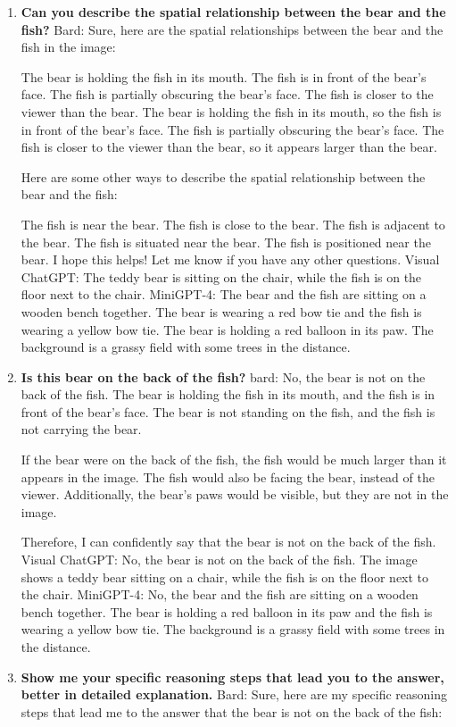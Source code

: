     \begin{enumerate}
        \item \textbf{Can you describe the spatial relationship between the bear and the fish?}
        \subitem Bard:
        Sure, here are the spatial relationships between the bear and the fish in the image:

        The bear is holding the fish in its mouth.
        The fish is in front of the bear's face.
        The fish is partially obscuring the bear's face.
        The fish is closer to the viewer than the bear.
        The bear is holding the fish in its mouth, so the fish is in front of the bear's face. The fish is partially obscuring the bear's face. The fish is closer to the viewer than the bear, so it appears larger than the bear.

        Here are some other ways to describe the spatial relationship between the bear and the fish:

        The fish is near the bear.
        The fish is close to the bear.
        The fish is adjacent to the bear.
        The fish is situated near the bear.
        The fish is positioned near the bear.
        I hope this helps! Let me know if you have any other questions.
        \subitem Visual ChatGPT: The teddy bear is sitting on the chair, while the fish is on the floor next to the chair.
        \subitem MiniGPT-4: The bear and the fish are sitting on a wooden bench together. The bear is wearing a red bow tie and the fish is wearing a yellow bow tie. The bear is holding a red balloon in its paw. The background is a grassy field with some trees in the distance.
        \item \textbf{Is this bear on the back of the fish?}
        \subitem bard:
        No, the bear is not on the back of the fish. The bear is holding the fish in its mouth, and the fish is in front of the bear's face. The bear is not standing on the fish, and the fish is not carrying the bear.
        
        If the bear were on the back of the fish, the fish would be much larger than it appears in the image. The fish would also be facing the bear, instead of the viewer. Additionally, the bear's paws would be visible, but they are not in the image.
        
        Therefore, I can confidently say that the bear is not on the back of the fish.
        \subitem Visual ChatGPT: No, the bear is not on the back of the fish. The image shows a teddy bear sitting on a chair, while the fish is on the floor next to the chair.
        \subitem MiniGPT-4: No, the bear and the fish are sitting on a wooden bench together. The bear is holding a red balloon in its paw and the fish is wearing a yellow bow tie. The background is a grassy field with some trees in the distance.
        \item \textbf{Show me your specific reasoning steps that lead you to the answer, better in detailed explanation.}
        \subitem Bard:
        Sure, here are my specific reasoning steps that lead me to the answer that the bear is not on the back of the fish:
        

\end{enumerate}
